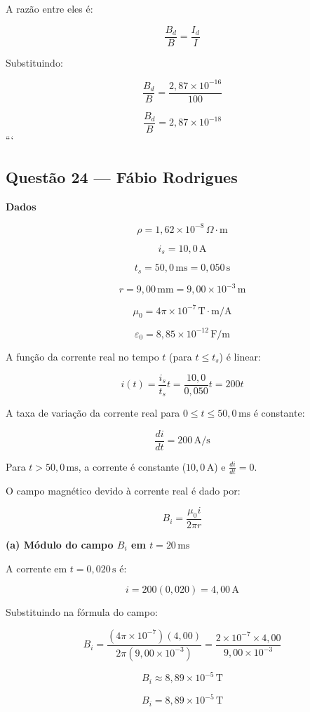 \documentclass[12pt,a4paper]{article}
\begin{document}
A razão entre eles é:

\[
\frac{B_d}{B}=\frac{I_d}{I}
\]

Substituindo:

\[
\frac{B_d}{B}
=
\frac{2,87\times10^{-16}}{100}
\]

\[
\frac{B_d}{B}
=
2,87\times10^{-18}
\]
```


\subsection{Questão 24 — Fábio Rodrigues}
\textbf{Dados}

\[
\rho = 1,62 \times 10^{-8}\,\Omega\cdot\text{m}
\]

\[
i_s = 10,0\,\text{A}
\]

\[
t_s = 50,0\,\text{ms} = 0,050\,\text{s}
\]

\[
r = 9,00\,\text{mm} = 9,00 \times 10^{-3}\,\text{m}
\]

\[
\mu_0 = 4\pi \times 10^{-7}\,\text{T}\cdot\text{m/A}
\]

\[
\varepsilon_0 = 8,85 \times 10^{-12}\,\text{F/m}
\]

A função da corrente real no tempo \(t\) (para \(t \le t_s\)) é linear:

\[
i(t) = \frac{i_s}{t_s} t = \frac{10,0}{0,050} t = 200 t
\]

A taxa de variação da corrente real para \(0 \le t \le 50,0\,\text{ms}\) é constante:

\[
\frac{di}{dt} = 200\,\text{A/s}
\]

Para \(t > 50,0\,\text{ms}\), a corrente é constante (\(10,0\,\text{A}\)) e \(\frac{di}{dt} = 0\).

O campo magnético devido à corrente real é dado por:

\[
B_i = \frac{\mu_0 i}{2\pi r}
\]

\textbf{(a) Módulo do campo \(B_i\) em \(t = 20\,\text{ms}\)}

A corrente em \(t = 0,020\,\text{s}\) é:

\[
i = 200(0,020) = 4,00\,\text{A}
\]

Substituindo na fórmula do campo:

\[
B_i = \frac{(4\pi \times 10^{-7})(4,00)}{2\pi(9,00 \times 10^{-3})} = \frac{2 \times 10^{-7} \times 4,00}{9,00 \times 10^{-3}}
\]

\[
B_i \approx 8,89 \times 10^{-5}\,\text{T}
\]

\[
\boxed{B_i = 8,89 \times 10^{-5}\,\text{T}}
\]
\end{document}
